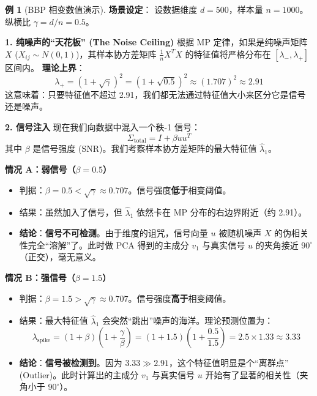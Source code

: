 \documentclass[11pt,a4paper]{ctexart}
\theoremstyle{definition}
\newtheorem{example}[theorem]{例}
\theoremstyle{remark}
\begin{document}
\begin{example}[BBP 相变数值演示]
    \textbf{场景设定}：
    设数据维度 $d=500$，样本量 $n=1000$。
    纵横比 $\gamma = d/n = 0.5$。
    
    \textbf{1. 纯噪声的“天花板” (The Noise Ceiling)}
    根据 MP 定律，如果是纯噪声矩阵 $X$ ($X_{ij} \sim N(0,1)$)，其样本协方差矩阵 $\frac{1}{n}X^TX$ 的特征值将严格分布在 $[\lambda_-, \lambda_+]$ 区间内。
    \textbf{理论上界}：
    \[
    \lambda_+ = (1 + \sqrt{\gamma})^2 = (1 + \sqrt{0.5})^2 \approx (1.707)^2 \approx \mathbf{2.91}
    \]
    这意味着：只要特征值不超过 2.91，我们都无法通过特征值大小来区分它是信号还是噪声。

    \textbf{2. 信号注入}
    现在我们向数据中混入一个秩-1 信号：
    \[ \Sigma_{\text{total}} = I + \beta u u^T \]
    其中 $\beta$ 是信号强度 (SNR)。我们考察样本协方差矩阵的最大特征值 $\hat{\lambda}_1$。
    
    \textbf{情况 A：弱信号（$\beta = 0.5$）}
    \begin{itemize}
        \item 判据：$\beta = 0.5 < \sqrt{\gamma} \approx 0.707$。信号强度\textbf{低于}相变阈值。
        \item 结果：虽然加入了信号，但 $\hat{\lambda}_1$ 依然卡在 MP 分布的右边界附近（约 2.91）。
        \item \textbf{结论}：\textbf{信号不可检测}。由于维度的诅咒，信号向量 $u$ 被随机噪声 $X$ 的伪相关性完全“溶解”了。此时做 PCA 得到的主成分 $v_1$ 与真实信号 $u$ 的夹角接近 $90^\circ$（正交），毫无意义。
    \end{itemize}

    \textbf{情况 B：强信号（$\beta = 1.5$）}
    \begin{itemize}
        \item 判据：$\beta = 1.5 > \sqrt{\gamma} \approx 0.707$。信号强度\textbf{高于}相变阈值。
        \item 结果：最大特征值 $\hat{\lambda}_1$ 会突然“跳出”噪声的海洋。理论预测位置为：
        \[
        \lambda_{\text{spike}} = (1+\beta)(1+\frac{\gamma}{\beta}) = (1+1.5)(1+\frac{0.5}{1.5}) = 2.5 \times 1.33 \approx \mathbf{3.33}
        \]
        \item \textbf{结论}：\textbf{信号被检测到}。因为 $3.33 \gg 2.91$，这个特征值明显是个“离群点” (Outlier)。此时计算出的主成分 $v_1$ 与真实信号 $u$ 开始有了显著的相关性（夹角小于 $90^\circ$）。
    \end{itemize}
\end{example}
\end{document}
